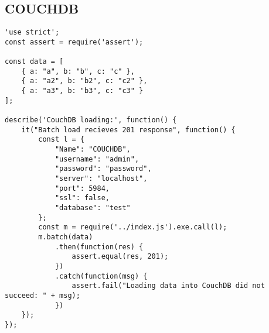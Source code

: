 \subsection{COUCHDB}
\label{COUCHDB-tests}
\begin{verbatim}
'use strict';
const assert = require('assert');

const data = [
    { a: "a", b: "b", c: "c" },
    { a: "a2", b: "b2", c: "c2" },
    { a: "a3", b: "b3", c: "c3" }
];

describe('CouchDB loading:', function() {
    it("Batch load recieves 201 response", function() {
        const l = {
            "Name": "COUCHDB",
            "username": "admin",
            "password": "password",
            "server": "localhost",
            "port": 5984,
            "ssl": false,
            "database": "test"
        };
        const m = require('../index.js').exe.call(l);
        m.batch(data)
            .then(function(res) {
                assert.equal(res, 201);
            })
            .catch(function(msg) {
                assert.fail("Loading data into CouchDB did not succeed: " + msg);
            })
    });
});
\end{verbatim}

